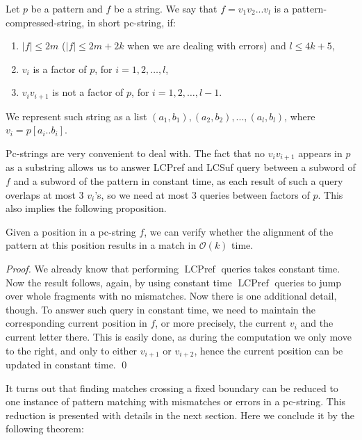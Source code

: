 \documentclass[runningheads]{llncs}
\DeclareMathOperator{\LCPref}{LCPref}
\begin{document}
\begin{definition}
Let $p$ be a pattern and $f$ be a string. We say that $f=v_1v_2...v_l$ is a pattern-compressed-string, in short pc-string, if: 
\begin{enumerate}
\item $|f|\leq 2m$ ($|f| \leq 2m+2k$ when we are dealing with errors) and $l\leq 4k+5$,
\item $v_i$ is a factor of $p$, for $i=1,2,\dots,l$,
\item $v_iv_{i+1}$ is not a factor of $p$, for $i=1,2,\dots,l-1$.
\end{enumerate}
We represent such string as a list $(a_1,b_1),(a_2,b_2),...,(a_l,b_l)$, where $v_i=p[a_i..b_i]$.
\end{definition}

Pc-strings are very convenient to deal with. The fact that no $v_iv_{i+1}$ appears in $p$ as a substring allows us to answer LCPref and LCSuf query between a subword of $f$ and a subword of the pattern in constant time, as each result of such a query overlaps at most 3 $v_i$'s, so we need at most 3 queries between factors of $p$. This also implies the
following proposition.



\begin{proposition}\label{proposition:verify_match_mismatches}
Given a position in a pc-string $f$, we can verify whether the alignment of the pattern at this position results in a match in $\mathcal{O}(k)$ time.
\end{proposition}
\begin{proof}
We already know that performing $\LCPref$ queries takes constant time. Now the result follows, again, by using constant time $\LCPref$ queries to jump over whole fragments with no mismatches. Now there is one additional detail, though. To answer such query in constant time, we need to maintain the corresponding current position in $f$, or more precisely, the current $v_{i}$ and the current letter there. This is easily done, as during the computation we only move to the right, and only to either $v_{i+1}$ or $v_{i+2}$, hence the current position can be updated in constant time.
\qed
\end{proof}




It turns out that finding matches crossing a fixed boundary can be reduced to one instance of pattern matching with mismatches or errors in a pc-string. This reduction is presented with details in the next section. Here we conclude it by the following theorem:
\end{document}

